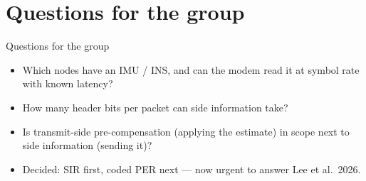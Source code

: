 \documentclass[aspectratio=169,11pt]{beamer}
\begin{document}
\section{Questions for the group}

\begin{frame}{Questions for the group}
\small
\begin{itemize}
\item Which nodes have an IMU / INS, and can the modem read it at symbol rate with known latency?
\item How many header bits per packet can side information take?
\item Is transmit-side pre-compensation (applying the estimate) in scope next to side information (sending it)?
\item {\color{mute}Decided: SIR first, coded PER next --- now urgent to answer Lee et al.\ 2026.}
\end{itemize}
\end{frame}
\end{document}
